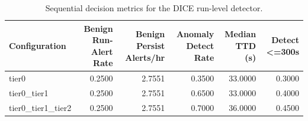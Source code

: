 \begin{table}[t]
\centering
\caption{Sequential decision metrics for the DICE run-level detector.}
\label{tab:dice_sequential_metrics}
\footnotesize
\begin{tabular}{lrrrrr}
\toprule
Configuration & Benign Run-Alert Rate & Benign Persist Alerts/hr & Anomaly Detect Rate & Median TTD (s) & Detect <=300s \\
\midrule
tier0 & 0.2500 & 2.7551 & 0.3500 & 33.0000 & 0.3000 \\
tier0_tier1 & 0.2500 & 2.7551 & 0.6500 & 33.0000 & 0.4000 \\
tier0_tier1_tier2 & 0.2500 & 2.7551 & 0.7000 & 36.0000 & 0.4500 \\
\bottomrule
\end{tabular}

\end{table}
